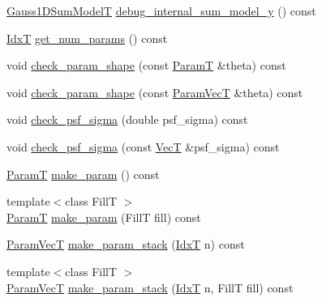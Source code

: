 \begin{DoxyCompactItemize}
\item 
\hyperlink{classmappel_1_1Gauss2DsModel_a23ae68443a62f76405e6f08f6dec4fb7}{Gauss1\+D\+Sum\+ModelT} \hyperlink{classmappel_1_1Gauss2DsModel_a2ce4737beb88367daeb480bf471ad2cf}{debug\+\_\+internal\+\_\+sum\+\_\+model\+\_\+y} () const 
\item 
\hyperlink{namespacemappel_ab17ec0f30b61ece292439d7ece81d3a8}{IdxT} \hyperlink{classmappel_1_1PointEmitterModel_a6fe8129bd24ab5c6620b3ab106b6c91a}{get\+\_\+num\+\_\+params} () const 
\item 
void \hyperlink{classmappel_1_1PointEmitterModel_a97a868e842302f670ed9f9bd49416771}{check\+\_\+param\+\_\+shape} (const \hyperlink{classmappel_1_1PointEmitterModel_a665ec6aea3aac139bb69a23c06d4b9a1}{ParamT} \&theta) const 
\item 
void \hyperlink{classmappel_1_1PointEmitterModel_a54b341a9bc0e32e2c8bbfe4ec0d8c9a1}{check\+\_\+param\+\_\+shape} (const \hyperlink{classmappel_1_1PointEmitterModel_add253b568d763f1513a810aac35de719}{Param\+VecT} \&theta) const 
\item 
void \hyperlink{classmappel_1_1PointEmitterModel_a01ce8d6358acbd2575be519dff1df89b}{check\+\_\+psf\+\_\+sigma} (double psf\+\_\+sigma) const 
\item 
void \hyperlink{classmappel_1_1PointEmitterModel_a85780ca544a5ef5e0a62e74005081677}{check\+\_\+psf\+\_\+sigma} (const \hyperlink{namespacemappel_a2225ad69f358daa3f4f99282a35b9a3a}{VecT} \&psf\+\_\+sigma) const 
\item 
\hyperlink{classmappel_1_1PointEmitterModel_a665ec6aea3aac139bb69a23c06d4b9a1}{ParamT} \hyperlink{classmappel_1_1PointEmitterModel_a1cd8ff64ce4132b6eaa8655696885749}{make\+\_\+param} () const 
\item 
{\footnotesize template$<$class FillT $>$ }\\\hyperlink{classmappel_1_1PointEmitterModel_a665ec6aea3aac139bb69a23c06d4b9a1}{ParamT} \hyperlink{classmappel_1_1PointEmitterModel_a5638e3df26cf84d7cf0f23112132682e}{make\+\_\+param} (FillT fill) const 
\item 
\hyperlink{classmappel_1_1PointEmitterModel_add253b568d763f1513a810aac35de719}{Param\+VecT} \hyperlink{classmappel_1_1PointEmitterModel_a6c7edc7f2549058df66472cd7647cf9b}{make\+\_\+param\+\_\+stack} (\hyperlink{namespacemappel_ab17ec0f30b61ece292439d7ece81d3a8}{IdxT} n) const 
\item 
{\footnotesize template$<$class FillT $>$ }\\\hyperlink{classmappel_1_1PointEmitterModel_add253b568d763f1513a810aac35de719}{Param\+VecT} \hyperlink{classmappel_1_1PointEmitterModel_abab975b04e09e6336a930b6d8fd8c267}{make\+\_\+param\+\_\+stack} (\hyperlink{namespacemappel_ab17ec0f30b61ece292439d7ece81d3a8}{IdxT} n, FillT fill) const 

\end{DoxyCompactItemize}
